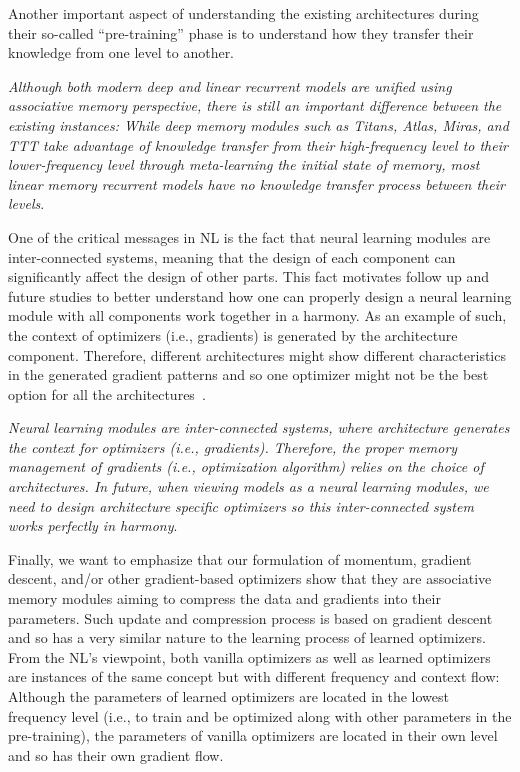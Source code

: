 \documentclass{article}
\newcommand{\citep}{\parencite}
\newcommand{\headred}[1]{\vspace{1.7mm}\noindent{{\textcolor{c5}{\bf #1.}}}}
\begin{document}
{Another important aspect of understanding the existing architectures during their so-called ``pre-training'' phase is to understand how they transfer their knowledge from one level to another. 

\begin{myboxismall}
    \textit{Although both modern deep and linear recurrent models are unified using associative memory perspective, there is still an important difference between the existing instances: While deep memory modules such as Titans, Atlas, Miras, and TTT take advantage of knowledge transfer from their high-frequency level to their lower-frequency level through meta-learning the initial state of memory, most linear memory recurrent models have no knowledge transfer process between their levels}.
\end{myboxismall}

\headred{Neural Learning Module as an Inter-Connected System}
One of the critical messages in NL is the fact that neural learning modules are inter-connected systems, meaning that the design of each component can significantly affect the design of other parts. This fact motivates follow up and future studies to better understand how one can properly design a neural learning module with all components work together in a harmony. As an example of such, the context of optimizers (i.e., gradients) is generated by the architecture component. Therefore, different architectures might show different characteristics in the generated gradient patterns and so one optimizer might not be the best option for all the architectures~\citep{zhang2024transformers}. 

\begin{myboxismall}
    \textit{Neural learning modules are inter-connected systems, where architecture generates the context for optimizers (i.e., gradients). Therefore, the proper memory management of gradients (i.e., optimization algorithm) relies on the choice of architectures. In future, when viewing models as a neural learning modules, we need to design architecture specific optimizers so this inter-connected system works perfectly in harmony}.
\end{myboxismall}

\headred{Optimizers vs. Learned Optimizers}
Finally, we want to emphasize that our formulation of momentum, gradient descent, and/or other gradient-based optimizers show that they are associative memory modules aiming to compress the data and gradients into their parameters. Such update and compression process is based on gradient descent and so has a very similar nature to the learning process of learned optimizers. From the NL's viewpoint, both vanilla optimizers as well as learned optimizers are instances of the same concept but with different frequency and context flow: Although the parameters of learned optimizers are located in the lowest frequency level (i.e., to train and be optimized along with other parameters in the pre-training), the parameters of vanilla optimizers are located in their own level and so has their own gradient flow.             

}
\end{document}
